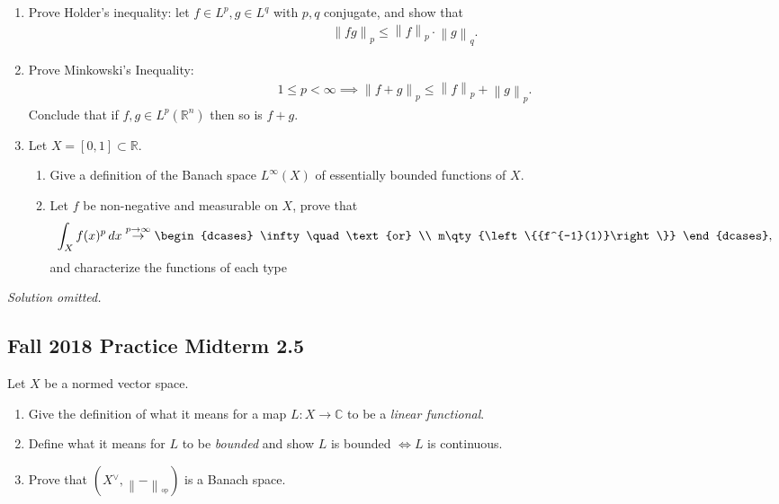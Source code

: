\begin{enumerate}
\def\labelenumi{\alph{enumi}.}
\item
  Prove Holder's inequality: let \(f\in L^p, g\in L^q\) with \(p, q\)
  conjugate, and show that
  \begin{align*}
  {\left\lVert {fg} \right\rVert}_{p} \leq {\left\lVert {f} \right\rVert}_{p} \cdot {\left\lVert {g} \right\rVert}_{q}
  .\end{align*}
\item
  Prove Minkowski's Inequality:
  \begin{align*}
  1\leq p < \infty \implies {\left\lVert {f+g} \right\rVert}_{p} \leq {\left\lVert {f} \right\rVert}_{p}+ {\left\lVert {g} \right\rVert}_{p}
  .\end{align*}
  Conclude that if \(f, g\in L^p({\mathbb{R}}^n)\) then so is \(f+g\).
\item
  Let \(X = [0, 1] \subset {\mathbb{R}}\).

  \begin{enumerate}
  \def\labelenumii{\arabic{enumii}.}
  \item
    Give a definition of the Banach space \(L^\infty(X)\) of essentially
    bounded functions of \(X\).
  \item
    Let \(f\) be non-negative and measurable on \(X\), prove that
    \begin{align*}
     \int_X f(x)^p \,dx \overset{p\to\infty}\to
     \begin{dcases}
     \infty \quad\text{or} \\
     m\qty{\left\{{f^{-1}(1)}\right\}}
     \end{dcases}
     ,\end{align*}
    and characterize the functions of each type
  \end{enumerate}
\end{enumerate}

\emph{Solution omitted.}

\hypertarget{fall-2018-practice-midterm-2.5}{%
\subsection{Fall 2018 Practice Midterm
2.5}\label{fall-2018-practice-midterm-2.5}}

Let \(X\) be a normed vector space.

\begin{enumerate}
\def\labelenumi{\alph{enumi}.}
\item
  Give the definition of what it means for a map \(L:X\to {\mathbb{C}}\)
  to be a \emph{linear functional}.
\item
  Define what it means for \(L\) to be \emph{bounded} and show \(L\) is
  bounded \(\iff L\) is continuous.
\item
  Prove that
  \((X {}^{ \vee }, {\left\lVert {{-}} \right\rVert}_{^{\operatorname{op}}})\)
  is a Banach space.
\end{enumerate}

